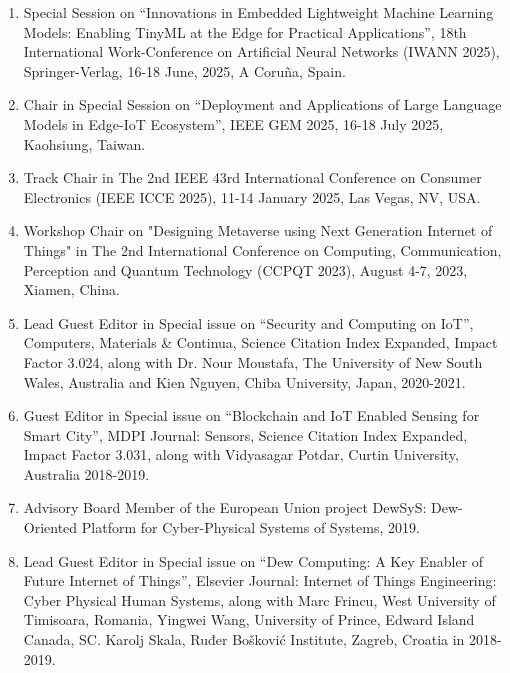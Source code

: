 \documentclass[11pt,a4paper]{moderncv}
\begin{document}
\begin{adjustwidth}{6em}{0pt}
	\begin{enumerate}

		\item Special Session on “Innovations in Embedded Lightweight Machine Learning Models: Enabling TinyML at the Edge for Practical Applications”, 18th International Work-Conference on Artificial Neural Networks (IWANN 2025), Springer-Verlag, 16-18 June, 2025, A Coruña, Spain.
		
		\item Chair in Special Session on “Deployment and Applications of Large Language Models in Edge-IoT Ecosystem”, IEEE GEM 2025, 16-18 July 2025, Kaohsiung, Taiwan.
		
		\item Track Chair in The 2nd IEEE 43rd International Conference on Consumer Electronics (IEEE ICCE 2025), 11-14 January 2025, Las Vegas, NV, USA.
		
		\item Workshop Chair on "Designing Metaverse using Next Generation Internet of Things" in The 2nd International Conference on Computing, Communication, Perception and Quantum Technology (CCPQT 2023), August 4-7, 2023, Xiamen, China.
		
		\item Lead Guest Editor in Special issue on “Security and Computing on IoT”, Computers, Materials \& Continua, Science Citation Index Expanded, Impact Factor 3.024, along with Dr. Nour Moustafa, The University of New South Wales, Australia and Kien Nguyen, Chiba University, Japan, 2020-2021.
		
		\item Guest Editor in Special issue on “Blockchain and IoT Enabled Sensing for Smart City”, MDPI Journal: Sensors, Science Citation Index Expanded, Impact Factor 3.031, along with Vidyasagar Potdar, Curtin University, Australia 2018-2019.
		
		\item Advisory Board Member of the European Union project DewSyS: Dew-Oriented Platform for Cyber-Physical Systems of Systems, 2019.
		
		\item Lead Guest Editor in Special issue on “Dew Computing: A Key Enabler of Future Internet of Things”, Elsevier Journal: Internet of Things Engineering: Cyber Physical Human Systems, along with Marc Frincu, West University of Timisoara, Romania, Yingwei Wang, University of Prince, Edward Island Canada, SC. Karolj Skala, Ruđer Bošković Institute, Zagreb, Croatia in 2018-2019.
		

\end{enumerate}
\end{adjustwidth}
\end{document}
